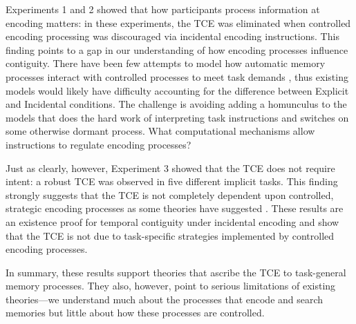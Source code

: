 \documentclass[man,natbib,floatsintext]{apa6} %
\begin{document}
Experiments 1 and 2 showed that how participants process information at encoding matters: in these experiments, the TCE was eliminated when controlled encoding processing was discouraged via incidental encoding instructions. This finding points to a gap in our understanding of how encoding processes influence contiguity. There have been few attempts to model how automatic memory processes interact with controlled processes to meet task demands \citep{LehmMalm13,PolyEtal09}, thus existing models would likely have difficulty accounting for the difference between Explicit and Incidental conditions. The challenge is avoiding adding a homunculus to the models that does the hard work of interpreting task instructions and switches on some otherwise dormant process. What computational mechanisms allow instructions to regulate encoding processes?

Just as clearly, however, Experiment 3 showed that the TCE does not require intent: a robust TCE was observed in five different implicit tasks. This finding strongly suggests that the TCE is not completely dependent upon controlled, strategic encoding processes as some theories have suggested \citep{Hint16}. These results are an existence proof for temporal contiguity under incidental encoding and show that the TCE is not due to task-specific strategies implemented by controlled encoding processes.

In summary, these results support theories that ascribe the TCE to task-general memory processes. They also, however, point to serious limitations of existing theories---we understand much about the processes that encode and search memories but little about how these processes are controlled.
\end{document}
